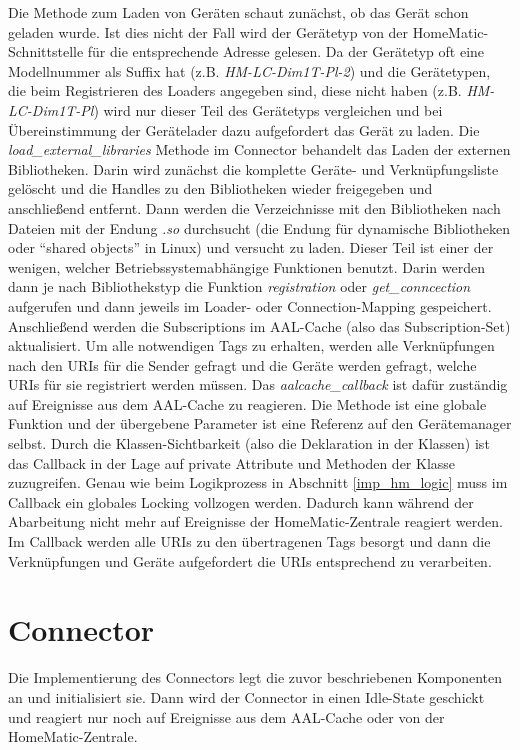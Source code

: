 Die Methode zum Laden von Geräten schaut zunächst, ob das Gerät schon geladen wurde.
Ist dies nicht der Fall wird der Gerätetyp von der HomeMatic-Schnittstelle für die entsprechende
Adresse gelesen.
Da der Gerätetyp oft eine Modellnummer als Suffix hat (z.B. \emph{HM-LC-Dim1T-Pl-2}) und die Gerätetypen,
die beim Registrieren des Loaders angegeben sind, diese nicht haben (z.B. \emph{HM-LC-Dim1T-Pl}) wird nur
dieser Teil des Gerätetyps vergleichen und bei Übereinstimmung der Gerätelader dazu aufgefordert
das Gerät zu laden.
Die \emph{load\_external\_libraries} Methode im Connector behandelt das Laden der externen Bibliotheken.
Darin wird zunächst die komplette Geräte- und Verknüpfungsliste gelöscht und die Handles
zu den Bibliotheken wieder freigegeben und anschließend entfernt.
Dann werden die Verzeichnisse mit den Bibliotheken nach Dateien mit der Endung \emph{.so} durchsucht (die
Endung für dynamische Bibliotheken oder ``shared objects'' in Linux) und versucht zu laden.
Dieser Teil ist einer der wenigen, welcher Betriebssystemabhängige Funktionen benutzt.
Darin werden dann je nach Bibliothekstyp die Funktion \emph{registration} oder \emph{get\_conncection}
aufgerufen und dann jeweils im Loader- oder Connection-Mapping gespeichert.
Anschließend werden die Subscriptions im AAL-Cache (also das Subscription-Set) aktualisiert.
Um alle notwendigen Tags zu erhalten, werden alle Verknüpfungen nach den URIs für die Sender gefragt und
die Geräte werden gefragt, welche URIs für sie registriert werden müssen.
Das \emph{aalcache\_callback} ist dafür zuständig auf Ereignisse aus dem AAL-Cache zu reagieren.
Die Methode ist eine globale Funktion und der übergebene Parameter ist eine Referenz auf den Gerätemanager selbst.
Durch die Klassen-Sichtbarkeit (also die Deklaration in der Klassen) ist das Callback in der Lage
auf private Attribute und Methoden der Klasse zuzugreifen.
Genau wie beim Logikprozess in Abschnitt \ref{imp_hm_logic} muss im Callback ein globales Locking vollzogen werden.
Dadurch kann während der Abarbeitung nicht mehr auf Ereignisse der HomeMatic-Zentrale reagiert werden.
Im Callback werden alle URIs zu den übertragenen Tags besorgt und dann die Verknüpfungen
und Geräte aufgefordert die URIs entsprechend zu verarbeiten.

\section{Connector}
\label{imp_conn}

Die Implementierung des Connectors legt die zuvor beschriebenen Komponenten an und initialisiert sie.
Dann wird der Connector in einen Idle-State geschickt und reagiert nur noch auf Ereignisse aus dem AAL-Cache
oder von der HomeMatic-Zentrale.

